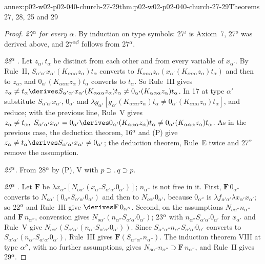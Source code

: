 \begin{annexitem}{annex:p02-w02-p02-040-church-27-29}{thm:p02-w02-p02-040-church-27-29}{Theorems 27, 28, 25 and 29}
\begin{proof}
\emph{27\(^\alpha\) for every \(\alpha\).}  By induction on type symbols:
27\(^\iota\) is Axiom~7, 27\(^o\) was derived above, and 27\(^{\alpha\beta}\)
follows from 27\(^\alpha\).

\emph{28\(^\alpha\)} \cite[\S6, p.~65]{Church1940}.  Let \(z_\alpha,t_\alpha\) be
distinct from each other and from every variable of \(x_{\alpha'}\).
By Rule~II,
\(S_{\alpha'\alpha'}x_{\alpha'}(K_{\alpha\alpha\alpha}z_\alpha)t_\alpha\) converts to
\(K_{\alpha\alpha\alpha}z_\alpha(x_{\alpha'}(K_{\alpha\alpha\alpha}z_\alpha)t_\alpha)\)
and then to \(z_\alpha\), and \(0_{\alpha'}(K_{\alpha\alpha\alpha}z_\alpha)t_\alpha\)
converts to \(t_\alpha\).  So Rule~III gives
\(z_\alpha\neq t_\alpha\derives
S_{\alpha'\alpha'}x_{\alpha'}(K_{\alpha\alpha\alpha}z_\alpha)t_\alpha\neq0_{\alpha'}(K_{\alpha\alpha\alpha}z_\alpha)t_\alpha\).
In 17 at type \(\alpha'\) substitute \(S_{\alpha'\alpha'}x_{\alpha'}\),
\(0_{\alpha'}\) and
\(\lambda g_{\alpha'}[g_{\alpha'}(K_{\alpha\alpha\alpha}z_\alpha)t_\alpha\neq0_{\alpha'}(K_{\alpha\alpha\alpha}z_\alpha)t_\alpha]\),
and reduce; with the previous line, Rule~V gives
\(z_\alpha\neq t_\alpha,\ S_{\alpha'\alpha'}x_{\alpha'}=0_{\alpha'}\derives
0_{\alpha'}(K_{\alpha\alpha\alpha}z_\alpha)t_\alpha\neq0_{\alpha'}(K_{\alpha\alpha\alpha}z_\alpha)t_\alpha\).
As in the previous case, the deduction theorem, 16\(^\alpha\) and (P) give
\(z_\alpha\neq t_\alpha\derives S_{\alpha'\alpha'}x_{\alpha'}\neq0_{\alpha'}\);
the deduction theorem, Rule~E twice and 27\(^\alpha\) remove the assumption.

\emph{25\(^\alpha\).}  From 28\(^\alpha\) by (P), V with \(p\supset.\,q\supset p\).

\emph{29\(^\alpha\)} \cite[\S6, p.~65]{Church1940}.  Let \(\mathbf F\) be
\(\lambda x_{\alpha''}[N_{o\alpha'}(x_{\alpha''}S_{\alpha'\alpha'}0_{\alpha'})]\);
\(n_{\alpha''}\) is not free in it.  First, \(\mathbf F\,0_{\alpha''}\)
converts to \(N_{o\alpha'}(0_{\alpha''}S_{\alpha'\alpha'}0_{\alpha'})\) and then to
\(N_{o\alpha'}0_{\alpha'}\), because \(0_{\alpha''}\) is
\(\lambda f_{\alpha'\alpha'}\lambda x_{\alpha'}x_{\alpha'}\); so 22\(^\alpha\) and
Rule~III give \(\derives\mathbf F\,0_{\alpha''}\).  Second, on the
assumptions \(N_{o\alpha''}n_{\alpha''}\) and \(\mathbf F\,n_{\alpha''}\),
conversion gives \(N_{o\alpha'}(n_{\alpha''}S_{\alpha'\alpha'}0_{\alpha'})\);
23\(^\alpha\) with \(n_{\alpha''}S_{\alpha'\alpha'}0_{\alpha'}\) for
\(x_{\alpha'}\) and Rule~V give
\(N_{o\alpha'}(S_{\alpha'\alpha'}(n_{\alpha''}S_{\alpha'\alpha'}0_{\alpha'}))\).
Since \(S_{\alpha''\alpha''}n_{\alpha''}S_{\alpha'\alpha'}0_{\alpha'}\) converts
to \(S_{\alpha'\alpha'}(n_{\alpha''}S_{\alpha'\alpha'}0_{\alpha'})\), Rule~III
gives \(\mathbf F(S_{\alpha''\alpha''}n_{\alpha''})\).  The induction theorem
VIII at type \(\alpha''\), with no further assumptions, gives
\(N_{o\alpha''}n_{\alpha''}\supset\mathbf F\,n_{\alpha''}\), and Rule~II gives
29\(^\alpha\).
\end{proof}
\end{annexitem}

